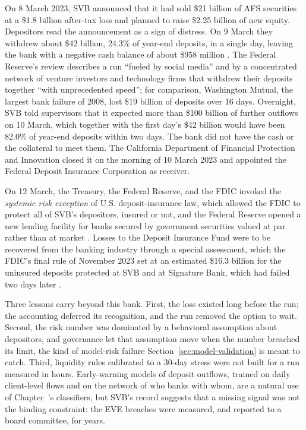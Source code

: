 \documentclass[../ai_in_finance]{subfiles}
\begin{document}
On 8 March 2023, SVB announced that it had sold \$21 billion of AFS securities at a \$1.8 billion after-tax loss and planned to raise \$2.25 billion of new equity. Depositors read the announcement as a sign of distress. On 9 March they withdrew about \$42 billion, 24.3\% of year-end deposits, in a single day, leaving the bank with a negative cash balance of about \$958 million \parencite{dfpi2023svb}. The Federal Reserve's review describes a run ``fueled by social media'' and by a concentrated network of venture investors and technology firms that withdrew their deposits together ``with unprecedented speed''; for comparison, Washington Mutual, the largest bank failure of 2008, lost \$19 billion of deposits over 16 days. Overnight, SVB told supervisors that it expected more than \$100 billion of further outflows on 10 March, which together with the first day's \$42 billion would have been 82.0\% of year-end deposits within two days. The bank did not have the cash or the collateral to meet them. The California Department of Financial Protection and Innovation closed it on the morning of 10 March 2023 and appointed the Federal Deposit Insurance Corporation as receiver.

On 12 March, the Treasury, the Federal Reserve, and the FDIC invoked the \emph{systemic risk exception} of U.S. deposit-insurance law, which allowed the FDIC to protect all of SVB's depositors, insured or not, and the Federal Reserve opened a new lending facility for banks secured by government securities valued at par rather than at market \parencite{treasury2023jointstatement}. Losses to the Deposit Insurance Fund were to be recovered from the banking industry through a special assessment, which the FDIC's final rule of November 2023 set at an estimated \$16.3 billion for the uninsured deposits protected at SVB and at Signature Bank, which had failed two days later \parencite{fdic2023specialassessment}.

Three lessons carry beyond this bank. First, the loss existed long before the run; the accounting deferred its recognition, and the run removed the option to wait. Second, the risk number was dominated by a behavioral assumption about depositors, and governance let that assumption move when the number breached its limit, the kind of model-risk failure Section~\ref{sec:model-validation} is meant to catch. Third, liquidity rules calibrated to a 30-day stress were not built for a run measured in hours. Early-warning models of deposit outflows, trained on daily client-level flows and on the network of who banks with whom, are a natural use of Chapter~'s classifiers, but SVB's record suggests that a missing signal was not the binding constraint: the EVE breaches were measured, and reported to a board committee, for years.
\end{document}
